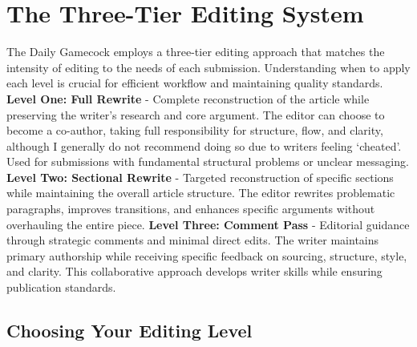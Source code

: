 \documentclass[12pt]{article}
\begin{document}
\newpage

\section{The Three-Tier Editing System}
\label{sec:three-tier}

The Daily Gamecock employs a three-tier editing approach that matches the intensity of editing to the needs of each submission. Understanding when to apply each level is crucial for efficient workflow and maintaining quality standards.
\newline\newline
\textbf{Level One: Full Rewrite}  -  Complete reconstruction of the article while preserving the writer's research and core argument. The editor can choose to become a co-author, taking full responsibility for structure, flow, and clarity, although I generally do not recommend doing so due to writers feeling `cheated'. Used for submissions with fundamental structural problems or unclear messaging.
\newline\newline
\textbf{Level Two: Sectional Rewrite}  -  Targeted reconstruction of specific sections while maintaining the overall article structure. The editor rewrites problematic paragraphs, improves transitions, and enhances specific arguments without overhauling the entire piece.
\newline\newline
\textbf{Level Three: Comment Pass}  -  Editorial guidance through strategic comments and minimal direct edits. The writer maintains primary authorship while receiving specific feedback on sourcing, structure, style, and clarity. This collaborative approach develops writer skills while ensuring publication standards.

\subsection{Choosing Your Editing Level}
\begin{center}
\end{center}
\end{document}
